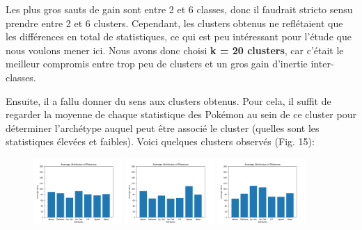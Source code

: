 \documentclass[a4paper,12pt]{article}
\begin{document}
Les plus gros sauts de gain sont entre 2 et 6 classes, donc il faudrait stricto
sensu prendre entre 2 et 6 clusters. Cependant, les clusters obtenus ne
reflétaient que les différences en total de statistiques, ce qui est peu
intéressant pour l'étude que nous voulons mener ici. Nous avons donc choisi
\textbf{k = 20 clusters}, car c'était le meilleur compromis entre trop peu de
clusters et un gros gain d'inertie inter-classes.

Ensuite, il a fallu donner du sens aux clusters obtenus. Pour cela, il suffit de
regarder la moyenne de chaque statistique des Pokémon au sein de ce cluster pour
déterminer l'archétype auquel peut être associé le cluster (quelles sont les
statistiques élevées et faibles). Voici quelques clusters observés (Fig. 15):


\begin{figure}[!h]
    \centering

    \includegraphics[width=0.3\textwidth]{Clustering/stats_cluster/7_Balanced.png}
    \includegraphics[width=0.3\textwidth]{Clustering/stats_cluster/10_SweepAtk.png}
    \includegraphics[width=0.3\textwidth]{Clustering/stats_cluster/8_TankSpecial.png}

    \vspace{1em}  %


\end{figure}
\end{document}
